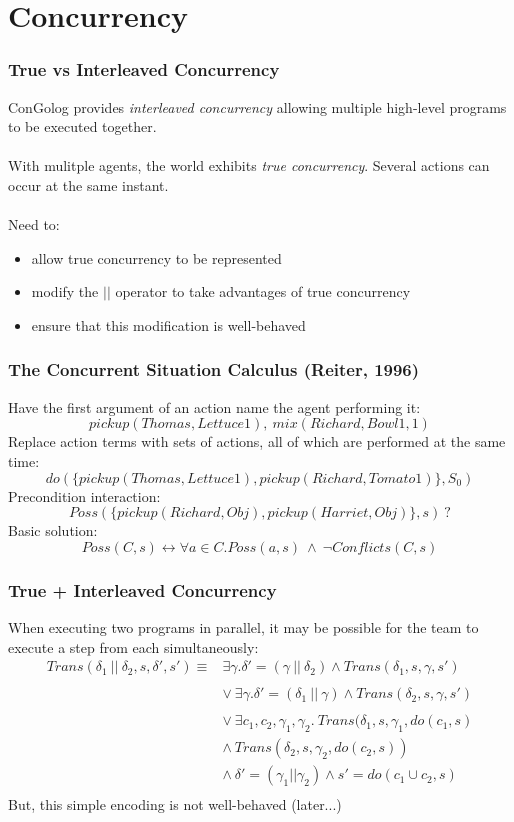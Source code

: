 \documentclass{beamer}
\begin{document}
\section{Concurrency}

\begin{frame}
\frametitle{True vs Interleaved Concurrency}
ConGolog provides \emph{interleaved concurrency} allowing multiple
high-level programs to be executed together.\\
\ \\
With mulitple agents, the world exhibits \emph{true concurrency}. Several
actions can occur at the same instant.\\
\ \\
\pause
Need to:
\begin{itemize}
  \item allow true concurrency to be represented
  \item modify the $||$ operator to take advantages of true concurrency
  \item ensure that this modification is well-behaved
\end{itemize}
\end{frame}

\begin{frame}
\frametitle{The Concurrent Situation Calculus (Reiter, 1996)}
Have the first argument of an action name the agent performing it:\[
pickup(Thomas,Lettuce1),\ mix(Richard,Bowl1,1)\]
\pause
Replace action terms with sets of actions, all of which are performed
at the same time:\[
do(\{pickup(Thomas,Lettuce1),pickup(Richard,Tomato1)\},S_0)\]
\pause
Precondition interaction:\[
Poss(\{pickup(Richard,Obj),pickup(Harriet,Obj)\},s)\ ?\]
\pause
Basic solution:\[
Poss(C,s) \leftrightarrow \forall a \in C.Poss(a,s)\ \wedge\ \neg Conflicts(C,s)\]
\end{frame}

\begin{frame}
\frametitle{True + Interleaved Concurrency}
When executing two programs in parallel, it may be possible for the team to
execute a step from each simultaneously:\[
\begin{array}{cc}
Trans(\delta_1\ ||\ \delta_2,s,\delta',s') \equiv & \exists \gamma . \delta'=(\gamma\ ||\ \delta_2)\wedge Trans(\delta_1,s,\gamma,s')\\
& \\
& \vee\ \exists \gamma . \delta'=(\delta_1\ ||\ \gamma)\wedge Trans(\delta_2,s,\gamma,s')\\
& \\
& \vee\ \exists c_1,c_2,\gamma_1,\gamma_2.\ Trans(\delta_1,s,\gamma_1,do(c_1,s)\\
& \wedge\ Trans(\delta_2,s,\gamma_2,do(c_2,s))\\
& \wedge\ \delta'=(\gamma_1||\gamma_2) \wedge s'=do(c_1 \cup c_2,s)\\
\end{array}\]
But, this simple encoding is not well-behaved (later...)
\end{frame}
\end{document}
